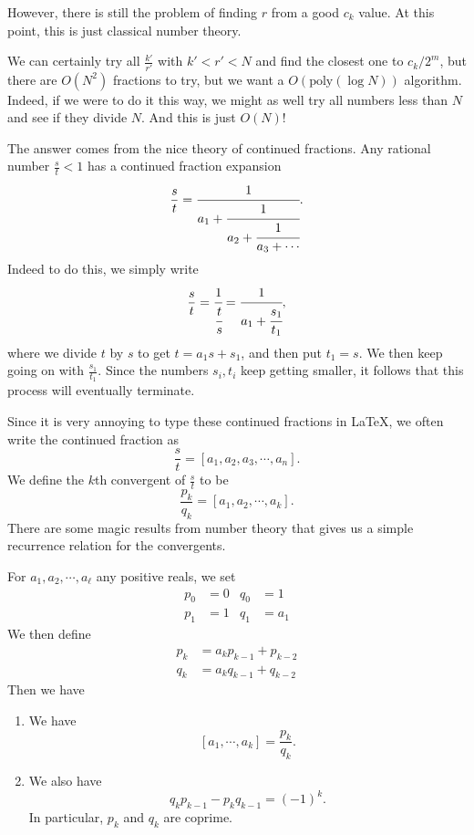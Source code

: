 However, there is still the problem of finding $r$ from a good $c_k$ value. At this point, this is just classical number theory.

We can certainly try all $\frac{k'}{r'}$ with $k' < r' < N$ and find the closest one to $c_k/2^m$, but there are $O(N^2)$ fractions to try, but we want a $O(\mathrm{poly}(\log N))$ algorithm. Indeed, if we were to do it this way, we might as well try all numbers less than $N$ and see if they divide $N$. And this is just $O(N)$!

The answer comes from the nice theory of continued fractions. Any rational number $\frac{s}{t} < 1$ has a continued fraction expansion
\[
  \frac{s}{t} = \cfrac{1}{a_1 + \cfrac{1}{a_2 + \cfrac{1}{a_3 + \cdots}}}.
\]
Indeed to do this, we simply write
\[
  \frac{s}{t} = \cfrac{1}{\cfrac{t}{s}} = \cfrac{1}{a_1 + \cfrac{s_1}{t_1}},
\]
where we divide $t$ by $s$ to get $t = a_1s + s_1$, and then put $t_1 = s$. We then keep going on with $\frac{s_1}{t_1}$. Since the numbers $s_i, t_i$ keep getting smaller, it follows that this process will eventually terminate.

Since it is very annoying to type these continued fractions in \LaTeX, we often write the continued fraction as
\[
  \frac{s}{t} = [a_1, a_2, a_3, \cdots, a_n].
\]
We define the $k$th convergent of $\frac{s}{t}$ to be
\[
  \frac{p_k}{q_k} = [a_1, a_2, \cdots, a_k].
\]
There are some magic results from number theory that gives us a simple recurrence relation for the convergents.
\begin{lemma}
  For $a_1, a_2, \cdots, a_\ell$ any positive reals, we set
  \begin{align*}
    p_0 &= 0 & q_0 &= 1\\
    p_1 &= 1 & q_1 &= a_1
  \end{align*}
  We then define
  \begin{align*}
    p_k &= a_k p_{k - 1} + p_{k - 2}\\
    q_k &= a_k q_{k - 1} + q_{k - 2}
  \end{align*}
  Then we have
  \begin{enumerate}
    \item We have
      \[
        [a_1, \cdots, a_k] = \frac{p_k}{q_k}.
      \]
    \item We also have
      \[
        q_k p_{k - 1} - p_k q_{k - 1} = (-1)^k.
      \]
      In particular, $p_k$ and $q_k$ are coprime.
  \end{enumerate}
\end{lemma}

